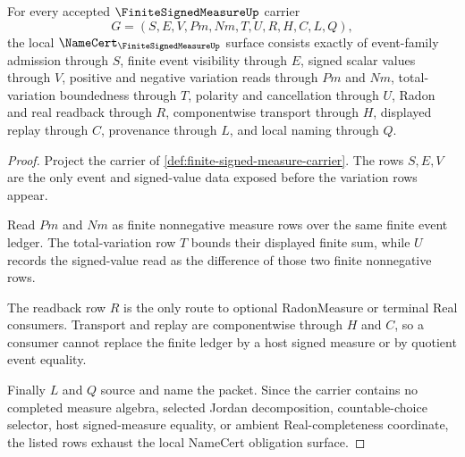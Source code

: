 \begin{theorem}
\label{thm:finite-signed-measure-namecert-obligations}
For every accepted $\FiniteSignedMeasureUp$ carrier
$$
G=(S,E,V,Pm,Nm,T,U,R,H,C,L,Q),
$$
the local $\NameCert_{\FiniteSignedMeasureUp}$ surface consists exactly of event-family admission through $S$, finite event visibility through $E$, signed scalar values through $V$, positive and negative variation reads through $Pm$ and $Nm$, total-variation boundedness through $T$, polarity and cancellation through $U$, Radon and real readback through $R$, componentwise transport through $H$, displayed replay through $C$, provenance through $L$, and local naming through $Q$.
\end{theorem}
\begin{proof}
Project the carrier of \autoref{def:finite-signed-measure-carrier}. The rows $S,E,V$ are the only event and signed-value data exposed before the variation rows appear.

Read $Pm$ and $Nm$ as finite nonnegative measure rows over the same finite event ledger. The total-variation row $T$ bounds their displayed finite sum, while $U$ records the signed-value read as the difference of those two finite nonnegative rows.

The readback row $R$ is the only route to optional RadonMeasure or terminal Real consumers. Transport and replay are componentwise through $H$ and $C$, so a consumer cannot replace the finite ledger by a host signed measure or by quotient event equality.

Finally $L$ and $Q$ source and name the packet. Since the carrier contains no completed measure algebra, selected Jordan decomposition, countable-choice selector, host signed-measure equality, or ambient Real-completeness coordinate, the listed rows exhaust the local NameCert obligation surface.
\end{proof}

